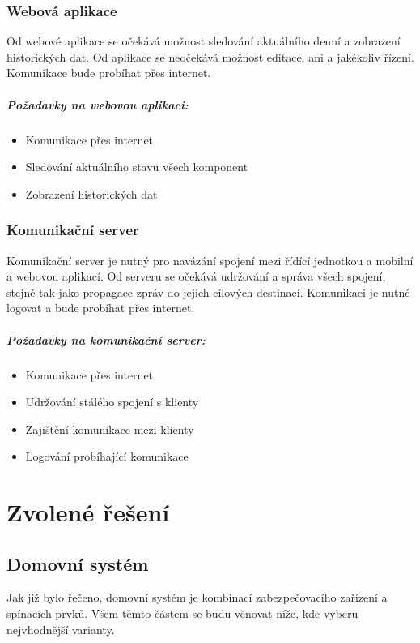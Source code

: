 \documentclass[FM,DP]{tulthesis}  %
\begin{document}
\subsection{Webová aplikace}
Od webové aplikace se očekává možnost sledování aktuálního denní a zobrazení historických dat. Od aplikace se neočekává možnost editace, ani a jakékoliv řízení. Komunikace bude probíhat přes internet.

\paragraph{Požadavky na webovou aplikaci:}
\begin{itemize}
\item Komunikace přes internet
\item Sledování aktuálního stavu všech komponent
\item Zobrazení historických dat
\end{itemize}

\subsection{Komunikační server}
Komunikační server je nutný pro navázání spojení mezi řídící jednotkou a mobilní a webovou aplikací. Od serveru se očekává udržování a správa všech spojení, stejně tak jako propagace zpráv do jejich cílových destinací. Komunikaci je nutné logovat a bude probíhat přes internet.

\paragraph{Požadavky na komunikační server:}
\begin{itemize}
\item Komunikace přes internet
\item Udržování stálého spojení s klienty
\item Zajištění komunikace mezi klienty
\item Logování probíhající komunikace
\end{itemize}


\chapter{Zvolené řešení}

\section{Domovní systém}
Jak již bylo řečeno, domovní systém je kombinací zabezpečovacího zařízení a spínacích prvků. Všem těmto částem se budu věnovat níže, kde vyberu nejvhodnější varianty.
\end{document}
